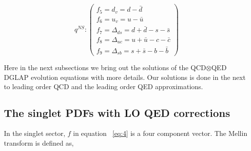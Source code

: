 \documentclass[review]{elsarticle}
\begin{document}
\begin{center}
\begin{equation}
q^{NS}:\left(\begin{array}{c}
{{f}_{5}}={{d}_{v}}=d-\bar{d}\\
{{f}_{6}}={{u}_{v}}=u-\bar{u}\\
{{f}_{7}}={{\Delta}_{ds}}=d+\bar{d}-s-\bar{s}\\
{{f}_{8}}={{\Delta}_{uc}}=u+\bar{u}-c-\bar{c}\\
{{f}_{9}}={{\Delta}_{sb}}=s+\bar{s}-b-\bar{b}
\end{array}\right)\label{eq:5}
\end{equation}
\par\end{center}
Here in the next subsections we bring out the solutions of the QCD$\otimes$QED
DGLAP evolution equations with more details. Our solutions is done
in the next to leading order QCD and the leading order QED approximations.

\subsection{The singlet PDFs with LO QED corrections}

In the singlet sector, $f$ in equation ~\eqref{eq:4} is a four component vector. The Mellin transform is defined as,
\end{document}
